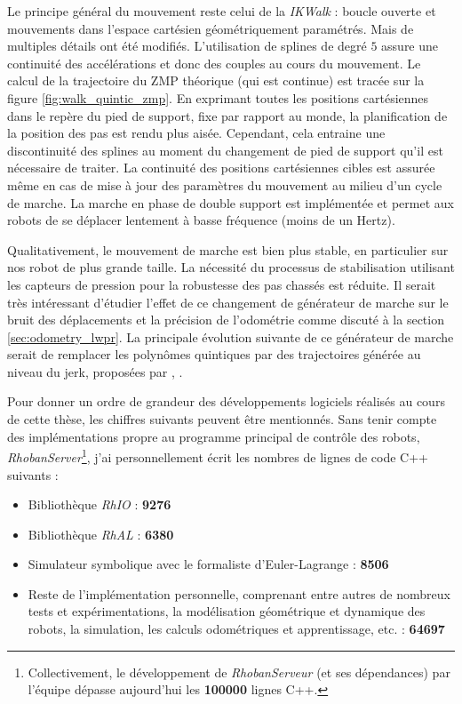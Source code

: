\begin{itemize}
        Le principe général du mouvement reste celui de la \textit{IKWalk} :
        boucle ouverte et mouvements dans l'espace cartésien géométriquement paramétrés. 
        Mais de multiples détails ont été modifiés.
        L'utilisation de splines de degré $5$ assure une continuité des accélérations 
        et donc des couples au cours du mouvement.
        Le calcul de la trajectoire du ZMP théorique (qui est continue) 
        est tracée sur la figure \ref{fig:walk_quintic_zmp}.
        En exprimant toutes les positions cartésiennes dans le repère du pied de support, 
        fixe par rapport au monde, la planification de la position des pas est rendu plus aisée.
        Cependant, cela entraine une discontinuité des splines au moment du changement 
        de pied de support qu'il est nécessaire de traiter.
        La continuité des positions cartésiennes cibles est assurée même en cas 
        de mise à jour des paramètres du mouvement au milieu d'un cycle de marche.
        La marche en phase de double support est implémentée et permet aux robots 
        de se déplacer lentement à basse fréquence (moins de un Hertz).
        
        Qualitativement, le mouvement de marche est bien plus stable, en particulier
        sur nos robot de plus grande taille. 
        La nécessité du processus de stabilisation utilisant les capteurs de pression
        pour la robustesse des pas chassés est réduite.
        Il serait très intéressant d'étudier l'effet de ce changement de générateur 
        de marche sur le bruit des déplacements et la précision de l'odométrie comme 
        discuté à la section \ref{sec:odometry_lwpr}.
        La principale évolution suivante de ce générateur de marche serait
        de remplacer les polynômes quintiques par des trajectoires 
        générée au niveau du jerk, proposées par 
        \cite{broquere2008soft}, \cite{broquere2011planification}.\\
\end{itemize}

Pour donner un ordre de grandeur des développements logiciels réalisés
au cours de cette thèse, les chiffres suivants peuvent être mentionnés.
Sans tenir compte des implémentations propre au programme principal 
de contrôle des robots, \textit{RhobanServer}\footnote{Collectivement, le développement 
de \textit{RhobanServeur} (et ses dépendances) par l'équipe 
dépasse aujourd'hui les \textbf{100000} lignes C++.},
j'ai personnellement écrit les nombres de lignes de code C++ suivants :
\begin{itemize}
    \item Bibliothèque \textit{RhIO} : \textbf{9276}
    \item Bibliothèque \textit{RhAL} : \textbf{6380}
    \item Simulateur symbolique avec le formaliste d'Euler-Lagrange : \textbf{8506}
    \item Reste de l'implémentation personnelle, 
        comprenant entre autres de nombreux tests et expérimentations, 
        la modélisation géométrique et dynamique des robots, 
        la simulation, les calculs odométriques et apprentissage, etc. : \textbf{64697}
\end{itemize}

